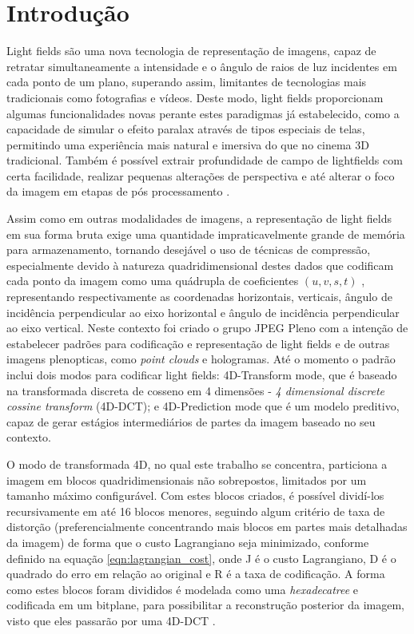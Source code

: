 \chapter{Introdução}
    Light fields são uma nova tecnologia de representação de imagens, capaz de retratar simultaneamente a intensidade e o ângulo de raios de luz 
    incidentes em cada ponto de um plano, superando assim, limitantes de tecnologias mais tradicionais como fotografias e vídeos. Deste modo,
    light fields proporcionam algumas funcionalidades novas perante estes paradigmas já estabelecido, como a capacidade de simular o efeito paralax
    através de tipos especiais de telas, permitindo uma experiência mais natural e imersiva do que no cinema 3D tradicional. Também é possível
    extrair profundidade de campo de lightfields com certa facilidade, realizar pequenas alterações de perspectiva e até alterar o foco da imagem em
    etapas de pós processamento \cite{lightfields_survey}.
    
    Assim como em outras modalidades de imagens, a representação de light fields em sua forma bruta exige uma quantidade impraticavelmente grande de
    memória para armazenamento, tornando desejável o uso de técnicas de compressão, especialmente devido à natureza quadridimensional destes dados
    que codificam cada ponto da imagem como uma quádrupla de coeficientes $(u, v, s, t)$ \cite{4d_codec}, representando respectivamente as coordenadas horizontais, 
    verticais, ângulo de incidência perpendicular ao eixo horizontal e ângulo de incidência perpendicular ao eixo vertical. Neste contexto foi criado
    o grupo JPEG Pleno com a intenção de estabelecer padrões para codificação e representação de light fields e de outras imagens plenopticas, como
    \textit{point clouds} e hologramas. Até o momento o padrão inclui dois modos para codificar light fields: 4D-Transform mode, que é baseado na transformada
    discreta de cosseno em 4 dimensões - \textit{4 dimensional discrete cossine transform} (4D-DCT); e 4D-Prediction mode que é um modelo preditivo, 
    capaz de gerar estágios intermediários de partes da imagem baseado no seu contexto.

    O modo de transformada 4D, no qual este trabalho se concentra, particiona a imagem em blocos quadridimensionais não sobrepostos,
    limitados por um tamanho máximo configurável. Com estes blocos criados, é possível dividí-los recursivamente em até 16 blocos menores, seguindo algum
    critério de taxa de distorção (preferencialmente concentrando mais blocos em partes mais detalhadas da imagem) de forma que o custo Lagrangiano seja
    minimizado, conforme definido na equação \ref{eqn:lagrangian_cost}, onde J é o custo Lagrangiano, D é o quadrado do erro em relação ao original e
    R é a taxa de codificação. A forma como estes blocos foram divididos é modelada como uma \textit{hexadecatree} e
    codificada em um bitplane, para possibilitar a reconstrução posterior da imagem, visto que eles passarão por uma 4D-DCT \cite{4d_codec}.
    
